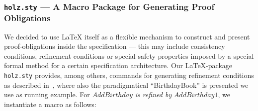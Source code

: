 \subsubsection{\texttt{holz.sty} --- A Macro Package for Generating Proof Obligations}
We decided to use \LaTeX{} itself as a flexible mechanism to construct and
present proof-obligations inside the specification --- this may include
consistency conditions, refinement conditions or special safety properties
imposed by a special formal method for a certain specification architecture. Our
\LaTeX-package \verb|holz.sty| provides, among others, commands for generating
refinement conditions as described in~\cite{spivey:z_notation:1992},
where also the paradigmatical ``BirthdayBook'' is presented we use as running 
example. For $AddBirthday$ \emph{is refined by} $AddBirthday1$, we instantiate 
a macro as follows:
